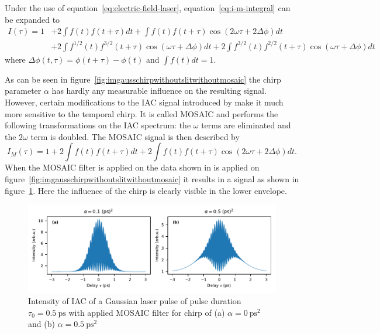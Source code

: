 Under the use of equation~\ref{eq:electric-field-laser}, equation~\eqref{eq:i-m-integral} can be expanded to
\begin{align}
I(\tau) = 1 &+ 2 \int f(t) f(t + \tau) dt + \int f(t) f(t + \tau) \cos(2 \omega \tau + 2 \Delta \phi) dt \nonumber\\
&+ 2 \int f^{1/2}(t) f^{3/2}(t + \tau) \cos(\omega \tau + \Delta \phi) dt + 2 \int f^{3/2}(t) f^{2/2}(t + \tau) \cos(\omega \tau + \Delta \phi) dt
\end{align}
where $\Delta \phi(t, \tau) = \phi(t + \tau) - \phi(t)$ and $\int f(t) dt = 1$.

As can be seen in figure~\ref{fig:imgausschirpwithoutslitwithoutmosaic} the chirp parameter $\alpha$ has hardly any measurable influence on the resulting signal.
However, certain modifications to the \ac{IAC} signal introduced by \textcite{hirayama_real-time_2002} make it much more sensitive to the temporal chirp.
It is called \ac{MOSAIC} and performs the following transformations on the \ac{IAC} spectrum: the $\omega$ terms are eliminated and the $2\omega$ term is doubled.
The \ac{MOSAIC} signal is then described by
\begin{equation}
\label{eq:i-m-filtered}
I_{M}(\tau) = 1 + 2 \int f(t) f(t + \tau) dt + 2 \int f(t) f(t + \tau) \cos(2\omega \tau + 2\Delta \phi) dt.
\end{equation}
When the MOSAIC filter is applied on the data shown in is applied on figure~\ref{fig:imgausschirpwithoutslitwithoutmosaic} it results in a signal as shown in figure~\ref{fig:mosaicchirpedlaserpulse}.
Here the influence of the chirp is clearly visible in the lower envelope.
\begin{figure}[H]
	\centering
	\includegraphics[width=\linewidth]{figures/chirp/plots/mosaic_chirped_laser_pulse}
	\caption{Intensity of IAC of a Gaussian laser pulse of pulse duration $\tau_0=\SI{0.5}{\pico \second}$ with applied MOSAIC filter for chirp of (a) $\alpha = \SI{0}{\pico \second \squared}$ and (b) $\alpha = \SI{0.5}{\pico \second \squared}$}
	\label{fig:mosaicchirpedlaserpulse}
\end{figure}

